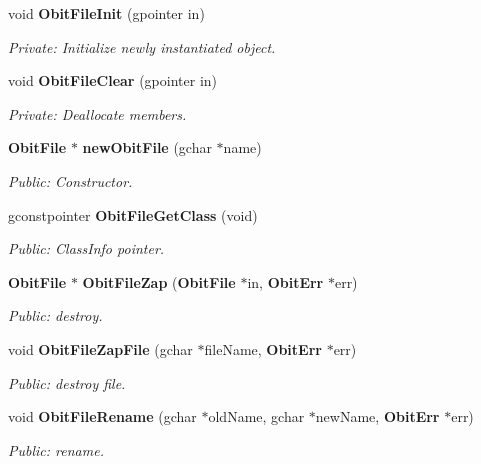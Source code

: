 \begin{CompactItemize}
\item 
void {\bf Obit\-File\-Init} (gpointer in)
\begin{CompactList}\small\item\em Private: Initialize newly instantiated object. \item\end{CompactList}\item 
void {\bf Obit\-File\-Clear} (gpointer in)
\begin{CompactList}\small\item\em Private: Deallocate members. \item\end{CompactList}\item 
{\bf Obit\-File} $\ast$ {\bf new\-Obit\-File} (gchar $\ast$name)
\begin{CompactList}\small\item\em Public: Constructor. \item\end{CompactList}\item 
gconstpointer {\bf Obit\-File\-Get\-Class} (void)
\begin{CompactList}\small\item\em Public: Class\-Info pointer. \item\end{CompactList}\item 
{\bf Obit\-File} $\ast$ {\bf Obit\-File\-Zap} ({\bf Obit\-File} $\ast$in, {\bf Obit\-Err} $\ast$err)
\begin{CompactList}\small\item\em Public: destroy. \item\end{CompactList}\item 
void {\bf Obit\-File\-Zap\-File} (gchar $\ast$file\-Name, {\bf Obit\-Err} $\ast$err)
\begin{CompactList}\small\item\em Public: destroy file. \item\end{CompactList}\item 
void {\bf Obit\-File\-Rename} (gchar $\ast$old\-Name, gchar $\ast$new\-Name, {\bf Obit\-Err} $\ast$err)
\begin{CompactList}\small\item\em Public: rename. \item\end{CompactList}\item 

\end{CompactItemize}
